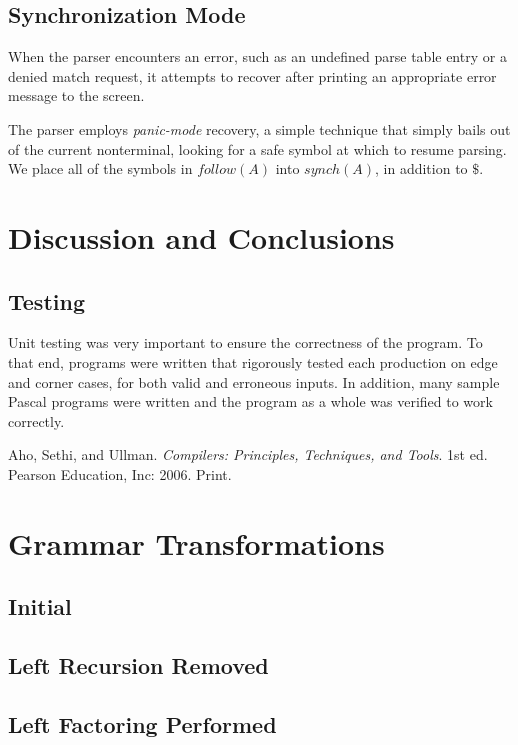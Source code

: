 \documentclass[titlepage]{article}
\begin{document}
		\subsection{Synchronization Mode}
		When the parser encounters an error, such as an undefined parse table entry or a denied match request, it attempts to recover after printing an appropriate error message to the screen.

		The parser employs \textit{panic-mode} recovery, a simple technique that simply bails out of the current nonterminal, looking for a safe symbol at which to resume parsing. We place all of the symbols in $follow(A)$ into $synch(A)$, in addition to $\$$.

	\section{Discussion and Conclusions}
		\subsection{Testing}
		Unit testing was very important to ensure the correctness of the program. To that end, programs were written that rigorously tested each production on edge and corner cases, for both valid and erroneous inputs. In addition, many sample Pascal programs were written and the program as a whole was verified to work correctly.

	\begin{thebibliography}{9}
			Aho, Sethi, and Ullman.
			\emph{Compilers: Principles, Techniques, and Tools}.
			1st ed.
			Pearson Education, Inc: 2006. Print.
	\end{thebibliography}
	\appendix
	\section{Grammar Transformations}
		\subsection{Initial}
		
		\subsection{Left Recursion Removed}
		
		\subsection{Left Factoring Performed}
		
\end{document}
